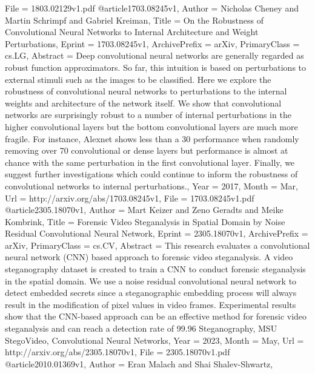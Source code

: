 {{{{File          = {1803.02129v1.pdf}
}
@article{1703.08245v1,
Author        = {Nicholas Cheney and Martin Schrimpf and Gabriel Kreiman},
Title         = {On the Robustness of Convolutional Neural Networks to Internal
  Architecture and Weight Perturbations},
Eprint        = {1703.08245v1},
ArchivePrefix = {arXiv},
PrimaryClass  = {cs.LG},
Abstract      = {Deep convolutional neural networks are generally regarded as robust function
approximators. So far, this intuition is based on perturbations to external
stimuli such as the images to be classified. Here we explore the robustness of
convolutional neural networks to perturbations to the internal weights and
architecture of the network itself. We show that convolutional networks are
surprisingly robust to a number of internal perturbations in the higher
convolutional layers but the bottom convolutional layers are much more fragile.
For instance, Alexnet shows less than a 30%
performance when randomly removing over 70%
convolutional or dense layers but performance is almost at chance with the same
perturbation in the first convolutional layer. Finally, we suggest further
investigations which could continue to inform the robustness of convolutional
networks to internal perturbations.},
Year          = {2017},
Month         = {Mar},
Url           = {http://arxiv.org/abs/1703.08245v1},
File          = {1703.08245v1.pdf}
}
@article{2305.18070v1,
Author        = {Mart Keizer and Zeno Geradts and Meike Kombrink},
Title         = {Forensic Video Steganalysis in Spatial Domain by Noise Residual
  Convolutional Neural Network},
Eprint        = {2305.18070v1},
ArchivePrefix = {arXiv},
PrimaryClass  = {cs.CV},
Abstract      = {This research evaluates a convolutional neural network (CNN) based approach
to forensic video steganalysis. A video steganography dataset is created to
train a CNN to conduct forensic steganalysis in the spatial domain. We use a
noise residual convolutional neural network to detect embedded secrets since a
steganographic embedding process will always result in the modification of
pixel values in video frames. Experimental results show that the CNN-based
approach can be an effective method for forensic video steganalysis and can
reach a detection rate of 99.96%
Steganography, MSU StegoVideo, Convolutional Neural Networks},
Year          = {2023},
Month         = {May},
Url           = {http://arxiv.org/abs/2305.18070v1},
File          = {2305.18070v1.pdf}
}
@article{2010.01369v1,
Author        = {Eran Malach and Shai Shalev-Shwartz},
}}}}
